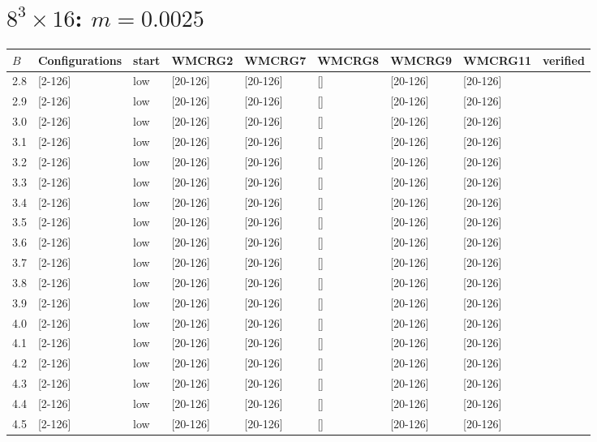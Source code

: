 \documentclass{article}
\begin{document}
  \section*{$8^3\times16$:  $m=0.0025$}
    \begin{tabular}{| l | l | l | l | l | l | l | l | l |}
      \hline
      $B$ & Configurations & start & WMCRG2 & WMCRG7 & WMCRG8 & WMCRG9 & WMCRG11 & verified\\
      \hline
      2.8 & [2-126] & low & [20-126] & [20-126] & [] & [20-126] & [20-126] &\\
      2.9 & [2-126] & low & [20-126] & [20-126] & [] & [20-126] & [20-126] &\\
      3.0 & [2-126] & low & [20-126] & [20-126] & [] & [20-126] & [20-126] &\\
      3.1 & [2-126] & low & [20-126] & [20-126] & [] & [20-126] & [20-126] &\\
      3.2 & [2-126] & low & [20-126] & [20-126] & [] & [20-126] & [20-126] &\\
      3.3 & [2-126] & low & [20-126] & [20-126] & [] & [20-126] & [20-126] &\\
      3.4 & [2-126] & low & [20-126] & [20-126] & [] & [20-126] & [20-126] &\\
      3.5 & [2-126] & low & [20-126] & [20-126] & [] & [20-126] & [20-126] &\\
      3.6 & [2-126] & low & [20-126] & [20-126] & [] & [20-126] & [20-126] &\\
      3.7 & [2-126] & low & [20-126] & [20-126] & [] & [20-126] & [20-126] &\\
      3.8 & [2-126] & low & [20-126] & [20-126] & [] & [20-126] & [20-126] &\\
      3.9 & [2-126] & low & [20-126] & [20-126] & [] & [20-126] & [20-126] &\\
      4.0 & [2-126] & low & [20-126] & [20-126] & [] & [20-126] & [20-126] &\\
      4.1 & [2-126] & low & [20-126] & [20-126] & [] & [20-126] & [20-126] &\\
      4.2 & [2-126] & low & [20-126] & [20-126] & [] & [20-126] & [20-126] &\\
      4.3 & [2-126] & low & [20-126] & [20-126] & [] & [20-126] & [20-126] &\\
      4.4 & [2-126] & low & [20-126] & [20-126] & [] & [20-126] & [20-126] &\\
      4.5 & [2-126] & low & [20-126] & [20-126] & [] & [20-126] & [20-126] &\\

\end{tabular}
\end{document}
